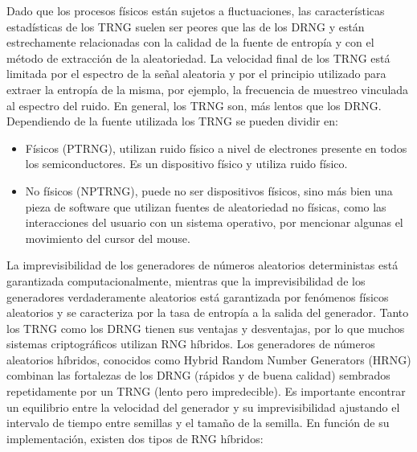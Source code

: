 \begin{enumerate}
                Dado que los procesos físicos están sujetos a fluctuaciones, las características estadísticas de los TRNG suelen ser peores que las de los DRNG y están estrechamente relacionadas con la calidad de la fuente de entropía y con el método de extracción de la aleatoriedad. La velocidad final de los TRNG está limitada por el espectro de la señal aleatoria y por el principio utilizado para extraer la entropía de la misma, por ejemplo, la frecuencia de muestreo vinculada al espectro del ruido. En general, los TRNG son, más lentos que los DRNG. Dependiendo de la fuente utilizada los TRNG se pueden dividir en:
            
            \begin{itemize}
                \item Físicos (PTRNG), utilizan ruido físico a nivel de electrones presente en todos los semiconductores. Es un dispositivo físico y utiliza ruido físico.
                \item No físicos (NPTRNG), puede no ser dispositivos físicos, sino más bien una pieza de software que utilizan fuentes de aleatoriedad no físicas, como las interacciones del usuario con un sistema operativo, por mencionar algunas el movimiento del cursor del mouse.
            \end{itemize}
        \end{enumerate}
	
        La imprevisibilidad de los generadores de números aleatorios deterministas está garantizada computacionalmente, mientras que la imprevisibilidad de los generadores verdaderamente aleatorios está garantizada por fenómenos físicos aleatorios y se caracteriza por la tasa de entropía a la salida del generador. Tanto los TRNG como los DRNG tienen sus ventajas y desventajas, por lo que muchos sistemas criptográficos utilizan RNG híbridos. Los generadores de números aleatorios híbridos, conocidos como Hybrid Random Number Generators (HRNG) combinan las fortalezas de los DRNG (rápidos y de buena calidad) sembrados repetidamente por un TRNG (lento pero impredecible). Es importante encontrar un equilibrio entre la velocidad del generador y su imprevisibilidad ajustando el intervalo de tiempo entre semillas y el tamaño de la semilla. En función de su implementación, existen dos tipos de RNG híbridos:
	
